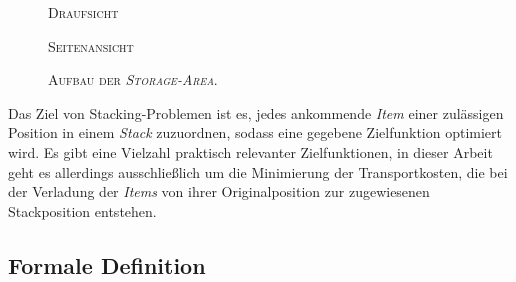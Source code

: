 \begin{figure}[H]
\centering
{}
\caption*{\textsc{Draufsicht}}
\end{figure}
\begin{figure}[H]
\centering
{}
\caption*{\textsc{Seitenansicht}}

\caption{\textsc{Aufbau der \textit{Storage-Area}}.}
\label{fig:storage_area}
\end{figure}

Das Ziel von Stacking-Problemen ist es, jedes ankommende \textit{Item} einer zulässigen Position in einem
\textit{Stack} zuzuordnen, sodass eine gegebene Zielfunktion optimiert wird. Es gibt eine Vielzahl praktisch relevanter Zielfunktionen,
in dieser Arbeit geht es allerdings ausschließlich um die Minimierung der Transportkosten, die bei der Verladung der \textit{Items} von ihrer Originalposition zur zugewiesenen Stackposition entstehen.

\pagebreak

\subsection{Formale Definition}
\label{sec:formal_definition}

